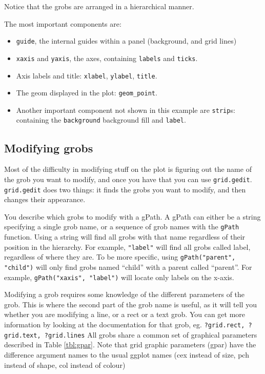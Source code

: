 Notice that the grobs are arranged in a hierarchical manner. 

The most important components are:

\begin{itemize}
  \item {\tt guide}, the internal guides within a panel (background, and grid lines)

  \item {\tt xaxis} and {\tt yaxis}, the axes, containing {\tt labels} and {\tt ticks}.

	\item Axis labels and title: {\tt xlabel}, {\tt ylabel}, {\tt title}.

  \item The geom displayed in the plot: {\tt geom\_point}.

	\item Another important component not shown in this example are {\tt strip}s: containing the {\tt background} background fill and {\tt label}.

\end{itemize}

\subsection{Modifying grobs}

Most of the difficulty in modifying stuff on the plot is figuring out the name of the grob you want to modify, and once you have that you can use {\tt grid.gedit}.  {\tt grid.gedit} does two things: it finds the grobs you want to modify, and then changes their appearance.  

You describe which grobs to modify with a gPath.  A gPath can either be a string specifying a single grob name, or a sequence of grob names with the {\tt gPath} function.  Using a string will find all grobs with that name regardless of their position in the hierarchy.  For example, {\tt "label"} will find all grobs called label, regardless of where they are.  To be more specific, using {\tt gPath("parent", "child")} will only find grobs named ``child'' with a parent called ``parent''.  For example, {\tt gPath("xaxis", "label")} will locate only labels on the x-axis.

Modifying a grob requires some knowledge of the different parameters of the grob.  This is where the second part of the grob name is useful, as it will tell you whether you are modifying a line, or a rect or a text grob.  You can get more information by looking at the documentation for that grob, eg. {\tt ?grid.rect, ?grid.text, ?grid.lines}   All grobs share a common set of graphical parameters described in Table \ref{tbl:gpar}.  Note that grid graphic parameters (gpar) have the difference argument names to the usual ggplot names (cex instead of size, pch instead of shape, col instead of colour)

